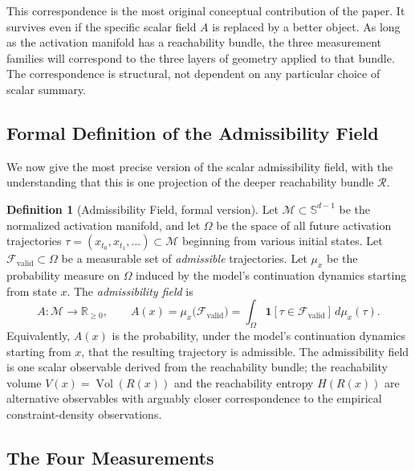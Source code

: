 \documentclass[12pt, a4paper]{article}
\theoremstyle{plain}
\theoremstyle{definition}
\newtheorem{definition}[theorem]{Definition}
\theoremstyle{remark}
\newcommand{\R}{\mathbb{R}}
\newcommand{\Sph}{\mathbb{S}}
\newcommand{\cM}{\mathcal{M}}
\newcommand{\cF}{\mathcal{F}}
\newcommand{\fA}{A}
\newcommand{\lra}{\longrightarrow}
\begin{document}
This correspondence is the most original conceptual contribution of the paper.
It survives even if the specific scalar field $\fA$ is replaced by a better
object. As long as the activation manifold has a reachability bundle, the
three measurement families will correspond to the three layers of geometry
applied to that bundle. The correspondence is structural, not dependent on
any particular choice of scalar summary.

\subsection{Formal Definition of the Admissibility Field}

We now give the most precise version of the scalar admissibility field, with
the understanding that this is one projection of the deeper reachability bundle
$\mathcal{R}$.

\begin{definition}[Admissibility Field, formal version]
  \label{def:admissibility_field_formal}
  Let $\cM \subset \Sph^{d-1}$ be the normalized activation manifold, and let
  $\Omega$ be the space of all future activation trajectories
  $\tau = (x_{t_0}, x_{t_1}, \ldots) \subset \cM$ beginning from various
  initial states. Let $\cF_{\mathrm{valid}} \subset \Omega$ be a measurable
  set of \emph{admissible} trajectories. Let $\mu_x$ be the probability measure
  on $\Omega$ induced by the model's continuation dynamics starting from
  state $x$. The \emph{admissibility field} is
  \begin{equation}
    \fA : \cM \lra \R_{\geq 0},
    \qquad
    \fA(x) = \mu_x\bigl(\cF_{\mathrm{valid}}\bigr)
             = \int_\Omega \mathbf{1}[\tau \in \cF_{\mathrm{valid}}] \, d\mu_x(\tau).
  \end{equation}
  Equivalently, $\fA(x)$ is the probability, under the model's continuation
  dynamics starting from $x$, that the resulting trajectory is admissible.
  The admissibility field is one scalar observable derived from the reachability
  bundle; the reachability volume $V(x) = \operatorname{Vol}(R(x))$ and the
  reachability entropy $H(R(x))$ are alternative observables with arguably
  closer correspondence to the empirical constraint-density observations.
\end{definition}

\subsection{The Four Measurements}
\end{document}
